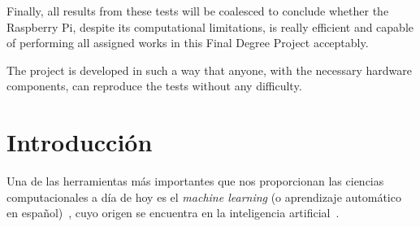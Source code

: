 \documentclass[a4paper, 12pt]{book}
\begin{document}
Finally, all results from these tests will be coalesced to conclude whether the Raspberry Pi, despite its computational limitations, is really efficient and capable of performing all assigned works in this Final Degree Project acceptably.

The project is developed in such a way that anyone, with the necessary hardware components, can reproduce the tests without any difficulty.





\tableofcontents 
\cleardoublepage
\listoffigures %
\cleardoublepage
\listoflistings


\cleardoublepage
\chapter{Introducción}
\label{sec:intro}

Una de las herramientas más importantes que nos proporcionan las ciencias computacionales a día de hoy es el \textit{machine learning} (o aprendizaje automático en español)~\cite{Flach2012}, cuyo origen se encuentra en la inteligencia artificial~\cite{Russell2020}. 
\end{document}
